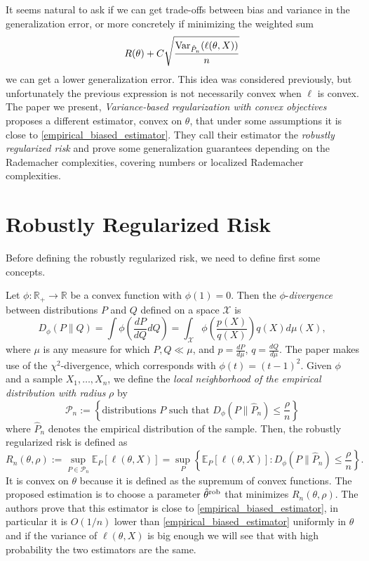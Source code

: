 It seems natural to ask if we can get trade-offs between bias and variance in the generalization error, or more concretely if minimizing the weighted sum
\begin{equation}\label{empirical_biased_estimator}
R(\theta) + C\sqrt{\frac{\text{Var}_{\hat{P}_n}(\ell(\theta, X))}{n}}
\end{equation}
we can get a lower generalization error. This idea was considered previously, but unfortunately the previous expression is not necessarily convex when $\ell$ is convex.  The paper we present, \textit{Variance-based regularization with convex objectives} \cite{duchi17roubust} proposes a different estimator, convex on $\theta$, that under some assumptions it is close to \eqref{empirical_biased_estimator}. They call their estimator the \textit{robustly regularized risk} and prove some generalization guarantees depending on the Rademacher complexities, covering numbers or localized Rademacher complexities.

\section{Robustly Regularized Risk}

Before defining the robustly regularized risk, we need to define first some concepts.

Let $\phi : \mathbb{R}_+ \rightarrow \mathbb{R}$ be a convex function with $\phi(1) = 0$. Then the $\phi$-\textit{divergence} between distributions $P$ and $Q$ defined on a space $\mathcal{X}$ is 
\[
    D_{\phi}(P\|Q) = \int \phi\left(\frac{dP}{dQ} dQ\right) = \int_{\mathcal{X}} \phi\left(\frac{p(X)}{q(X)}\right) q(X) d\mu(X),
\]
where $\mu$ is any measure for which $P,Q  \ll \mu$, and $p= \frac{dP}{d\mu}$, $q = \frac{dQ}{d\mu}$. The paper makes use of the $\chi^2$-divergence, which corresponds with $\phi(t)=(t-1)^2$. Given $\phi$ and a sample $X_1, \dots, X_n$, we define the \textit{local neighborhood of the empirical distribution with radius} $\rho$ by 
\[
    \mathcal{P}_n := \left\{ \text{distributions } P \text{ such that } D_\phi\left(P \| \hat{P}_n\right)\leq \frac{\rho}{n } \right\}
\]
where $\hat{P}_n$ denotes the empirical distribution of the sample. Then, the robustly regularized risk is defined as
\[
    R_n(\theta, \rho) := \sup_{P\in\mathcal{P}_n} \mathbb{E}_P [\ell(\theta, X)] = \sup_{P}\left\{\mathbb{E}_P[\ell(\theta, X)]: D_{\phi}(P\|\hat{P}_n) \leq \frac{\rho}{n}\right\}.
\]
It is convex on $\theta$ because it is defined as the supremum of convex functions. The proposed estimation is to choose a parameter $\hat{\theta}^{\text{rob}}$ that minimizes $R_n(\theta, \rho)$. The authors prove that this estimator is close to \eqref{empirical_biased_estimator}, in particular it is $O(1/n)$ lower than  \eqref{empirical_biased_estimator} uniformly in $\theta$ and if the variance of $\ell(\theta, X)$ is big enough we will see that with high probability the two estimators are the same.

